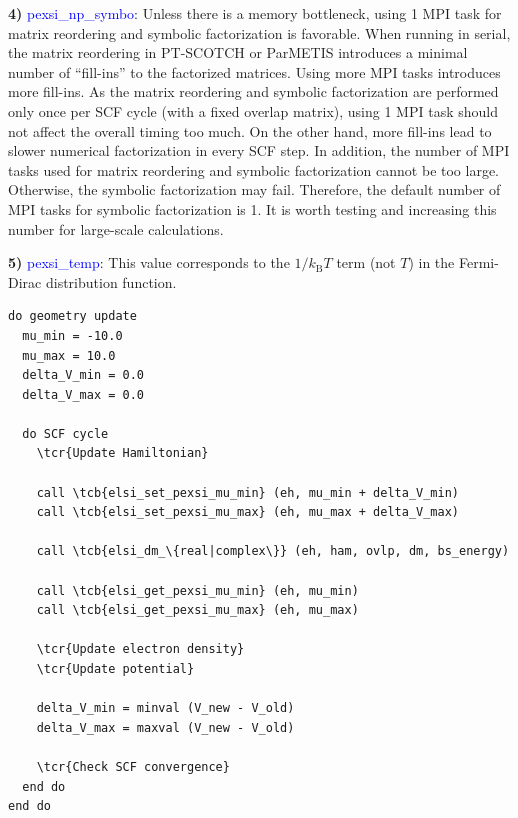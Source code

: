 \documentclass{report}
\newcommand{\tcb}[1]{\textcolor{blue}{#1}}
\newcommand{\tcr}[1]{\textcolor{red}{#1}}
\begin{document}
\textbf{4)} \tcb{pexsi\_np\_symbo}: Unless there is a memory bottleneck, using 1 MPI task for matrix reordering and symbolic factorization is favorable. When running in serial, the matrix reordering in PT-SCOTCH or ParMETIS introduces a minimal number of ``fill-ins'' to the factorized matrices. Using more MPI tasks introduces more fill-ins. As the matrix reordering and symbolic factorization are performed only once per SCF cycle (with a fixed overlap matrix), using 1 MPI task should not affect the overall timing too much. On the other hand, more fill-ins lead to slower numerical factorization in every SCF step. In addition, the number of MPI tasks used for matrix reordering and symbolic factorization cannot be too large. Otherwise, the symbolic factorization may fail. Therefore, the default number of MPI tasks for symbolic factorization is 1. It is worth testing and increasing this number for large-scale calculations.

\textbf{5)} \tcb{pexsi\_temp}: This value corresponds to the $1/k_\text{B} T$ term (not $T$) in the Fermi-Dirac distribution function.

\begin{tcolorbox}
\begin{Verbatim}[commandchars=\\\{\}]
do geometry update
  mu_min = -10.0
  mu_max = 10.0
  delta_V_min = 0.0
  delta_V_max = 0.0

  do SCF cycle
    \tcr{Update Hamiltonian}

    call \tcb{elsi_set_pexsi_mu_min} (eh, mu_min + delta_V_min)
    call \tcb{elsi_set_pexsi_mu_max} (eh, mu_max + delta_V_max)

    call \tcb{elsi_dm_\{real|complex\}} (eh, ham, ovlp, dm, bs_energy)

    call \tcb{elsi_get_pexsi_mu_min} (eh, mu_min)
    call \tcb{elsi_get_pexsi_mu_max} (eh, mu_max)

    \tcr{Update electron density}
    \tcr{Update potential}

    delta_V_min = minval (V_new - V_old)
    delta_V_max = maxval (V_new - V_old)

    \tcr{Check SCF convergence}
  end do
end do
\end{Verbatim}
\end{tcolorbox}
\end{document}
